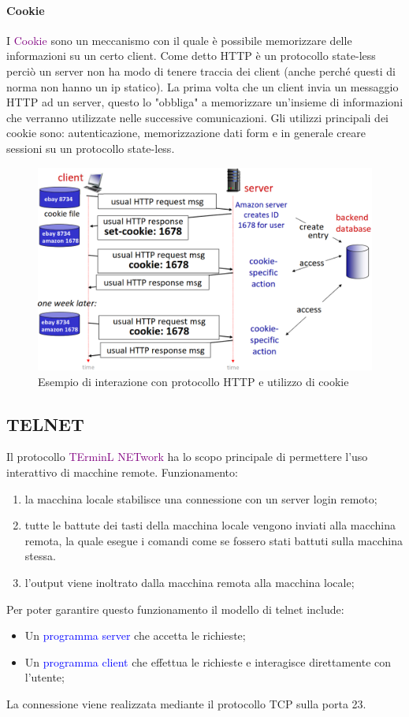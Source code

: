 \paragraph{Cookie} I \textcolor{purple}{Cookie} sono un meccanismo con il quale è possibile memorizzare delle informazioni su un certo client.
Come detto HTTP è un protocollo state-less perciò un server non ha modo di tenere traccia dei client (anche perché questi di norma non hanno un ip statico).
La prima volta che un client invia un messaggio HTTP ad un server, questo lo "obbliga" a memorizzare un'insieme di informazioni che verranno utilizzate nelle successive comunicazioni.
\newline Gli utilizzi principali dei cookie sono: autenticazione, memorizzazione dati form e in generale creare sessioni su un protocollo state-less.

\begin{figure}[h]
    \centering
    \includegraphics[scale=0.27]{Immagini/Cookie.png}
    \caption{Esempio di interazione con protocollo HTTP e utilizzo di cookie}
\end{figure}
\newpage
\subsection{TELNET} Il protocollo \textcolor{purple}{TErminL NETwork} ha lo scopo principale di permettere l'uso interattivo di macchine remote. Funzionamento:
\begin{enumerate}
    \item la macchina locale stabilisce una connessione con un server login remoto;
    \item tutte le battute dei tasti della macchina locale vengono inviati alla macchina remota, la quale esegue i comandi come se fossero stati battuti sulla macchina stessa.
    \item l'output viene inoltrato dalla macchina remota alla macchina locale;
\end{enumerate}
Per poter garantire questo funzionamento il modello di telnet include:
\begin{itemize}
    \item Un \textcolor{blue}{programma server} che accetta le richieste;
    \item Un \textcolor{blue}{programma client} che effettua le richieste e interagisce direttamente con l'utente;
\end{itemize}
La connessione viene realizzata mediante il protocollo TCP sulla porta 23.

